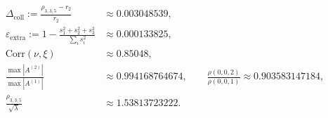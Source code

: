\[
\begin{aligned}
\Delta_{\mathrm{coll}}:=\frac{\rho_{3,3,5}-r_2}{r_2}&\approx 0.003048539,\\
\varepsilon_{\mathrm{extra}}:=1-\frac{s_1^2+s_2^2+s_3^2}{\sum_i s_i^2}&\approx 0.000133825,\\
\mathrm{Corr}(\nu,\xi)&\approx 0.85048,\\
\frac{\max|A^{(2)}|}{\max|A^{(1)}|}&\approx 0.994168764674,\qquad\frac{\rho(0,0,2)}{\rho(0,0,1)}\approx 0.903583147184,\\
\frac{\rho_{3,3,5}}{\sqrt{\lambda}}&\approx 1.53813723222.
\end{aligned}
\]
